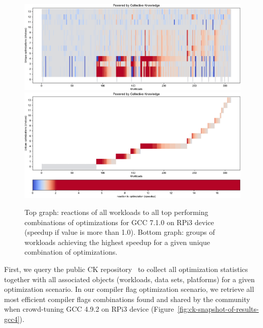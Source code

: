   \begin{figure}[!htbp]
     \centering
      \includegraphics[width=6.6in]
      {ck-assets/29119378e09b4dc8-cropped.pdf} %
      \vspace{0.1in}
      \includegraphics[width=6.6in]
      {ck-assets/2d416955df7546b1-cropped.pdf} %
     \caption{
       Top graph: reactions of all workloads 
          to all top performing combinations of optimizations
          for GCC 7.1.0 on RPi3 device (speedup if value is more than 1.0).
       Bottom graph: groups of workloads achieving the highest speedup
          for a given unique combination of optimizations.
     }
     \label{fig:ck-reactions-gcc7}
   \end{figure}

First, we query the public CK repository~\cite{live-ck-repo}
to collect all optimization statistics together with all associated objects 
(workloads, data sets, platforms) for a given optimization scenario. 
%
In our compiler flag optimization scenario, we retrieve all
most efficient compiler flags combinations found and shared
by the community when crowd-tuning GCC 4.9.2 on RPi3 device
(Figure~\ref{fig:ck-snapshot-of-results-gcc4}).

